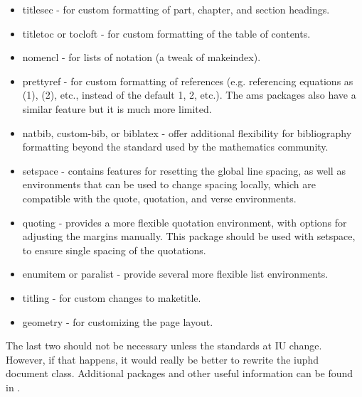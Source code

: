 \begin{itemize}
 \item titlesec - for custom formatting of part, chapter, and section headings.
 \item titletoc or tocloft - for custom formatting of the table of contents.
 \item nomencl - for lists of notation (a tweak of makeindex).
 \item prettyref - for custom formatting of references (e.g. referencing equations as (1), (2), etc., instead of the default
       1, 2, etc.).  The ams packages also have a similar feature but it is much more limited.
 \item natbib, custom-bib, or biblatex - offer additional flexibility for bibliography formatting beyond the standard used by
       the mathematics community.
 \item setspace - contains features for resetting the global line spacing, as well as environments that can be used to change
       spacing locally, which are compatible with the quote, quotation, and verse environments.
 \item quoting - provides a more flexible quotation environment, with options for adjusting the margins manually.  This package
     should be used with setspace, to ensure single spacing of the quotations.
 \item enumitem or paralist - provide several more flexible list environments.
 \item titling - for custom changes to maketitle.
 \item geometry - for customizing the page layout.
\end{itemize}


The last two should not be necessary unless the standards at IU change.  However, if that happens, it would really be better to
rewrite the iuphd document class.  Additional packages and other useful information can be found in \cite{mittelbach2004latex}.

